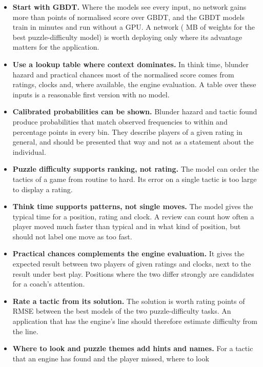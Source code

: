 \documentclass[11pt]{article}
\begin{document}
\begin{itemize}
\item \textbf{Start with GBDT.} Where the models see every input, no
network gains more than  points of normalised
score over GBDT, and the GBDT models train in minutes and run without a GPU.
A network ( MB of weights for
the best puzzle-difficulty model) is worth deploying only where its
advantage matters for the application.
\item \textbf{Use a lookup table where context dominates.} In think time,
blunder hazard and practical chances most of the normalised score comes from
ratings, clocks and, where available, the engine evaluation. A table over
these inputs is a reasonable first version with no model.
\item \textbf{Calibrated probabilities can be shown.} Blunder hazard and
tactic found produce probabilities that match observed frequencies to within
 and
 percentage points in every
bin. They describe players of a given rating in general, and should be
presented that way and not as a statement about the individual.
\item \textbf{Puzzle difficulty supports ranking, not rating.} The model can
order the tactics of a game from routine to hard. Its error on a single
tactic is too large to display a rating.
\item \textbf{Think time supports patterns, not single moves.} The model
gives the typical time for a position, rating and clock. A review can count
how often a player moved much faster than typical and in what kind of
position, but should not label one move as too fast.
\item \textbf{Practical chances complements the engine evaluation.} It gives
the expected result between two players of given ratings and clocks, next to
the result under best play. Positions where the two differ strongly are
candidates for a coach's attention.
\item \textbf{Rate a tactic from its solution.} The solution is worth
 rating points of RMSE
between the best models of the two puzzle-difficulty tasks. An application
that has the engine's line should therefore estimate difficulty from the
line.
\item \textbf{Where to look and puzzle themes add hints and names.} For a
tactic that an engine has found and the player missed, where to look

\end{itemize}
\end{document}
